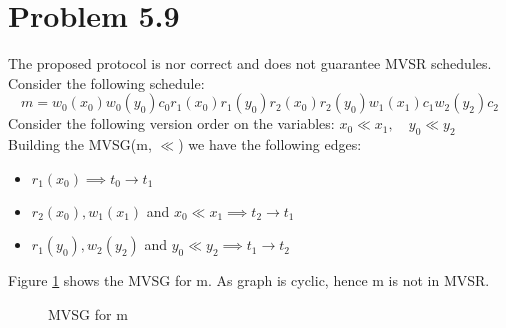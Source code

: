 \documentclass[12pt]{article}
\begin{document}
\section*{Problem 5.9}
The proposed protocol is nor correct and does not guarantee MVSR schedules. \\
Consider the following schedule:
\begin{equation*}
    m = w_0(x_0) w_0(y_0) c_0 r_1(x_0) r_1(y_0) r_2(x_0) r_2(y_0) w_1(x_1) c_1 w_2(y_2) c_2
\end{equation*}
Consider the following version order on the variables: $x_0 \ll x_1, \quad y_0 \ll y_2$\\
Building the MVSG(m, $\ll$) we have the following edges:
\begin{itemize}
    \item $r_1(x_0) \implies t_0 \rightarrow t_1$
    \item $r_2(x_0), w_1(x_1)$ and $x_0 \ll x_1 \implies t_2 \rightarrow t_1$
    \item $r_1(y_0), w_2(y_2)$ and $y_0 \ll y_2 \implies t_1 \rightarrow t_2$
\end{itemize}
Figure \ref{fig:mvsg_q3} shows the MVSG for m. As graph is cyclic, hence m is not in MVSR.\\
\begin{figure}[h]
    \centering
    \caption{MVSG for m}
    \label{fig:mvsg_q3}
    
\end{figure}
\end{document}
